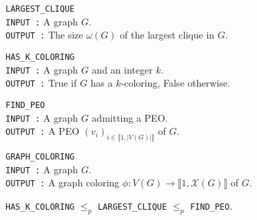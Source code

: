 \begin{problem}
    \texttt{LARGEST\_CLIQUE} \\
    \texttt{INPUT :} A graph $G$. \\
    \texttt{OUTPUT :} The size $\omega(G)$ of the largest clique in $G$.
\end{problem}

\begin{problem}
    \texttt{HAS\_K\_COLORING} \\
    \texttt{INPUT :} A graph $G$ and an integer $k$. \\
    \texttt{OUTPUT :} True if $G$ has a $k$-coloring, False otherwise.
\end{problem}

\begin{problem}
    \texttt{FIND\_PEO} \\
    \texttt{INPUT :} A graph $G$ admitting a PEO. \\
    \texttt{OUTPUT :} A PEO $(v_i)_{i\in\llbracket 1, \mid V(G) \mid \rrbracket}$ of $G$.
\end{problem}

\begin{problem}
    \texttt{GRAPH\_COLORING} \\
    \texttt{INPUT :} A graph $G$. \\
    \texttt{OUTPUT :} A graph coloring $\phi : V(G) \rightarrow \llbracket 1, \mathcal{X}(G) \rrbracket$ of $G$.
\end{problem}

\begin{proposition}
    \texttt{HAS\_K\_COLORING} $\leq_p$ \texttt{LARGEST\_CLIQUE} $\leq_p$ \texttt{FIND\_PEO}.
\end{proposition}

